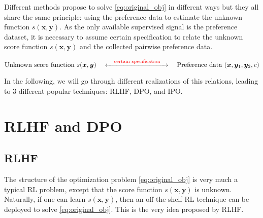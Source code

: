 \documentclass[11pt,a4paper]{article}
\begin{document}
Different methods propose to solve \eqref{eq:original_obj} in different ways but they all share the same principle: using the preference data to estimate the unknown function $s(\bm{x}, \bm{y})$.
As the only available supervised signal is the preference dataset, it is necessary to assume certain specification to relate the unknown score function $s(\bm{x}, \bm{y})$ and the collected pairwise preference data.
\begin{tcolorbox}[center]
    \begin{equation}
        \label{eq:general_spec}
\text{Unknown score function } s(\bm{x}, \bm{y}) \quad \xleftrightarrow{\quad \text{\color{red}certain specification}\quad } \quad \text{Preference data } (\bm{x}, \bm{y}_1, \bm{y}_2, c)
    \end{equation} 
\end{tcolorbox}
In the following, we will go through different realizations of this relations, leading to 3 different popular techniques: RLHF, DPO, and IPO.

\section{RLHF and DPO}%
\label{sec:rlhf_and_dpo}
\subsection{RLHF}%
\label{sub:rlhf}
The structure of the optimization problem \eqref{eq:original_obj} is very much a typical RL problem, except that the score function $s(\bm{x}, \bm{y})$ is unknown. 
Naturally, if one can learn $s(\bm{x}, \bm{y})$, then an off-the-shelf RL technique can be deployed to solve \eqref{eq:original_obj}. This is the very idea proposed by RLHF.
\end{document}
